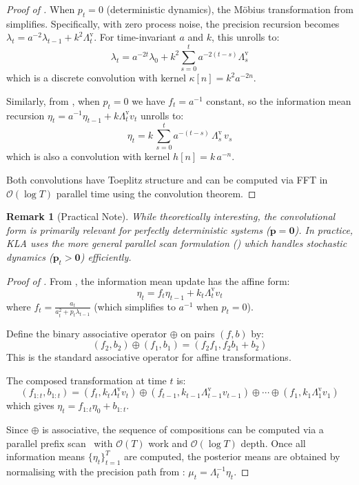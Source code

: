 \documentclass{article}
\newtheorem*{remark}{Remark}
\newcommand{\our}{\textsc{KLA}\xspace}
\begin{document}
\begin{mdframed}
\begin{proof}[Proof of ]
When $p_t = 0$ (deterministic dynamics), the M\"{o}bius transformation from
 simplifies. Specifically, with zero process noise, the
precision recursion becomes $\lambda_t = a^{-2}\lambda_{t-1} + k^2\Lambda_t^{\mathrm{v}}$.
For time-invariant $a$ and $k$, this unrolls to:
\[
\lambda_t = a^{-2t}\lambda_0 + k^2\sum_{s=0}^t a^{-2(t-s)} \Lambda^{\mathrm{v}}_s
\]
which is a discrete convolution with kernel $\kappa[n] = k^2 a^{-2n}$.

Similarly, from , when $p_t=0$ we have $f_t = a^{-1}$
constant, so the information mean recursion $\eta_t = a^{-1}\eta_{t-1} + k\Lambda_t^{\mathrm{v}}v_t$
unrolls to:
\[
\eta_t = k\,\sum_{s=0}^{t} a^{-(t-s)}\,\Lambda_s^{\mathrm{v}}\,v_s
\]
which is also a convolution with kernel $h[n] = k\,a^{-n}$.

Both convolutions have Toeplitz structure and can be computed via FFT in
$\mathcal{O}(\log T)$ parallel time using the convolution theorem.
\end{proof}
\end{mdframed}

\begin{remark}[Practical Note]
While theoretically interesting, the convolutional form is primarily relevant for
perfectly deterministic systems ($\mathbf{p}=\mathbf{0}$). In practice, \our uses the more general
parallel scan formulation () which handles stochastic
dynamics ($\mathbf{p}_t > \mathbf{0}$) efficiently.
\end{remark}
\newpage
\CorMeanParallelScan*

\begin{mdframed}
\begin{proof}[Proof of ]
From , the information mean update has the affine form:
\[
\eta_t = f_t \eta_{t-1} + k_t \Lambda_t^{\mathrm{v}} v_t
\]
where $f_t = \frac{a_t}{a_t^2 + p_t \lambda_{t-1}}$ (which simplifies to $a^{-1}$ when $p_t = 0$).

Define the binary associative operator $\oplus$ on pairs $(f, b)$ by:
\[
(f_2, b_2) \oplus (f_1, b_1) = (f_2 f_1, f_2 b_1 + b_2)
\]
This is the standard associative operator for affine transformations.

The composed transformation at time $t$ is:
\[
(f_{1:t}, b_{1:t}) = (f_t, k_t \Lambda_t^{\mathrm{v}} v_t) \oplus (f_{t-1}, k_{t-1} \Lambda_{t-1}^{\mathrm{v}} v_{t-1}) \oplus \cdots \oplus (f_1, k_1 \Lambda_1^{\mathrm{v}} v_1)
\]
which gives $\eta_t = f_{1:t} \eta_0 + b_{1:t}$.

Since $\oplus$ is associative, the sequence of compositions can be computed via
a parallel prefix scan~\citep{blelloch1990prefix} with $\mathcal{O}(T)$ work and $\mathcal{O}(\log T)$ depth.
Once all information means $\{\eta_t\}_{t=1}^T$ are computed, the posterior means are
obtained by normalising with the precision path from :
$\mu_t = \Lambda_t^{-1}\eta_t$.
\end{proof}
\end{mdframed}
\end{document}
